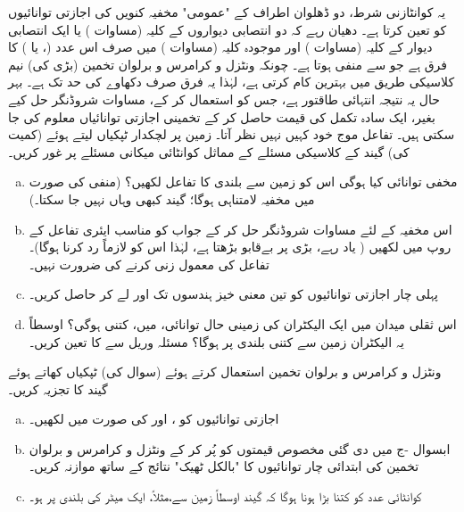  یہ کوانٹازنی شرط،   دو  ڈھلوان اطراف کے "عمومی"   مخفیہ کنویں کی اجازتی توانائیوں کو  تعین کرتا ہے۔  دھیان رہے کہ   دو انتصابی دیواروں کے  کلیہ (مساوات ) یا  ایک انتصابی دیوار کے  کلیہ (مساوات ) اور موجودہ کلیہ (مساوات )  میں صرف اس عدد (،  یا )  کا فرق ہے جو   سے منفی ہوتا ہے۔ چونکہ ونٹزل و کرامرس و برلوان  تخمین  (بڑی  کی)  نیم کلاسیکی  طریق میں بہترین کام کرتی ہے، لہٰذا یہ فرق صرف دکھاوے کی حد تک ہے۔ بہر حال یہ نتیجہ انتہائی طاقتور ہے،  جس کو استعمال کر کے،  مساوات شروڈنگر  حل کیے بغیر،  ایک سادہ تکمل کی قیمت حاصل کر کے تخمینی اجازتی توانائیاں معلوم کی جا سکتی ہیں۔ تفاعل موج خود کہیں نہیں نظر آتا۔
زمین پر   لچکدار   ٹپکیاں لیتے  ہوئے  (کمیت  کی)  گیند کے کلاسیکی مسئلے کے مماثل کوانٹائی میکانی مسئلے پر غور کریں۔
\begin{enumerate}[a.]
\item
 مخفی توانائی کیا ہوگی اس کو زمین سے بلندی  کا  تفاعل لکھیں؟ (منفی  کی صورت میں مخفیہ لامتناہی ہوگا؛  گیند کبھی وہاں  نہیں جا سکتا۔)
\item
 اس مخفیہ کے لئے مساوات شروڈنگر حل کر کے  جواب کو مناسب ایئری تفاعل کے روپ میں لکھیں ( یاد رہے،  بڑی   پر   بےقابو بڑھتا ہے،  لہٰذا اس کو  لازماً رد کرنا ہوگا)۔ تفاعل  کی معمول زنی کرنے  کی ضرورت نہیں۔
\item
 پہلی چار اجازتی توانائیوں کو تین معنی خیز ہندسوں تک  اور  لے کر حاصل کریں۔
\item
 اس ثقلی میدان میں ایک الیکٹران کی زمینی حال توانائی،   میں،  کتنی ہوگی؟ اوسطاً یہ الیکٹران زمین سے کتنی بلندی پر ہوگا؟  مسئلہ وریل سے  کا  تعین کریں۔
 \end{enumerate}
 ونٹزل و کرامرس و برلوان   تخمین استعمال کرتے ہوئے (سوال   کی)  ٹپکیاں  کھاتے ہوئے گیند کا تجزیہ کریں۔
\begin{enumerate}[a.]
\item
 اجازتی توانائیوں   کو ،   اور  کی صورت میں لکھیں۔
\item
 ابسوال -ج  میں دی گئی مخصوص قیمتوں کو پُر کر کے ونٹزل و کرامرس و برلوان  تخمین کی ابتدائی چار توانائیوں کا "بالکل ٹھیک"  نتائج کے ساتھ موازنہ کریں۔
\item
کوانٹائی عدد  کو  کتنا بڑا ہونا ہوگا کہ گیند اوسطاً زمین سے،مثلاً،  ایک میٹر کی بلندی پر ہو۔
\end{enumerate}

